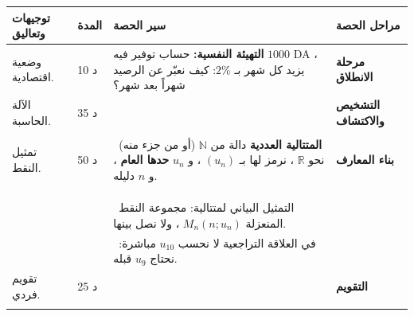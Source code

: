\documentclass[12pt,a4paper]{article}
\newenvironment{LTR}{\begin{otherlanguage}{english}}{\end{otherlanguage}}
\newcommand{\ar}[1]{\foreignlanguage{arabic}{#1}}
\newcommand{\Phase}[1]{\textbf{#1}}
\newenvironment{Sayr}{%
\begin{LTR}\renewcommand{\arraystretch}{1.25}\setlength{\tabcolsep}{4pt}\relpenalty=10000\binoppenalty=10000\tolerance=9000\emergencystretch=0.3\linewidth
\begin{longtable}{|p{0.09\textwidth}|>{\centering\arraybackslash}p{0.05\textwidth}|p{0.71\textwidth}|>{\centering\arraybackslash}p{0.09\textwidth}|}
\hline\rowcolor{cThm!12}\ar{\footnotesize\textbf{توجيهات وتعاليق}} & \ar{\footnotesize\textbf{المدة}} & \ar{\textbf{سير الحصة}} & \ar{\footnotesize\textbf{مراحل الحصة}}\\\hline\endhead
\hline\endfoot}{\end{longtable}\end{LTR}}
\newcommand{\Row}[4]{\ar{\small #4} & \ar{#3} & \ar{#2} & \cellcolor{cThm!8}\ar{\Phase{#1}}\\\hline}
\newcommand{\Lab}[2]{\foreignlanguage{english}{\tcbox[on line,colback=#1,colframe=#1,boxrule=0pt,arc=2pt,boxsep=1pt,left=5pt,right=5pt,top=1pt,bottom=1pt]{\ar{\textcolor{white}{\textbf{#2}}}}}}
\newcommand{\RR}[1]{\ifmmode{\color{cThm}#1}\else$\mbox{\color{cThm}#1}$\fi}
\newcommand{\T}[1]{$\mbox{\color{cDef}\bfseries #1}$}
\begin{document}
\begin{Sayr}
\Row{مرحلة الانطلاق}{%
\textbf{التهيئة النفسية:} حساب توفير فيه $1000$ DA ، يزيد كل شهر بـ $2\%$: كيف نعبّر عن الرصيد شهراً بعد شهر؟}{10 د}{وضعية اقتصادية.}
\Row{التشخيص والاكتشاف}{%
\Lab{cEx}{وضعية مقترحة}\ نرمز بـ $u_n$ للرصيد بعد $n$ شهراً ، مع $u_0=1000$.\par\textbf{(1)} احسب $u_1$ ، $u_2$ ، $u_3$.\par\textbf{(2)} عبّر عن $u_{n+1}$ بدلالة $u_n$.}{35 د}{الآلة الحاسبة.}
\Row{}{%
\Lab{cDef}{مناقشة النشاط}\par\textbf{(1)} \T{حساب الحدود:} زيادة $2\%$ تعني الضرب في $1+\dfrac2{100}=1{,}02$:\par $u_1=1000\times1{,}02=\RR{1020}$ ؛ $u_2=1020\times1{,}02=\RR{1040{,}4}$ ؛ $u_3=1040{,}4\times1{,}02=\RR{1061{,}208}$.\par\textbf{(2)} \T{العلاقة بين $u_{n+1}$ و $u_n$:} كل رصيد يُحسب من الرصيد الذي قبله: $\RR{u_{n+1}=1{,}02\,u_n}$ (علاقة تراجعية).}{}{}
\Row{بناء المعارف}{%
\Lab{cDef}{تعريف}\ \textbf{المتتالية العددية} دالة من $\mathbb N$ (أو من جزء منه) نحو $\mathbb R$ ، نرمز لها بـ $(u_n)$ ، و $u_n$ \textbf{حدها العام} ، و $n$ دليله.}{50 د}{تمثيل النقط.}
\Row{}{%
\Lab{cMeth}{طرق توليد متتالية}\par\textbf{(1)} \T{بدستور صريح} $u_n=f(n)$: نحسب أي حد مباشرة.\par\textbf{(2)} \T{بعلاقة تراجعية} $u_{n+1}=f(u_n)$ مع حد أول معلوم: نحسب الحدود واحداً بعد الآخر.}{}{}
\Row{}{%
\Lab{cEx}{مثال 1}\ (صريحة) $u_n=n^2-4n$:\par $u_0=0^2-4\times0=\RR{0}$ ؛ $u_1=1-4=\RR{-3}$ ؛ $u_2=4-8=\RR{-4}$ ؛ $u_3=9-12=\RR{-3}$.}{}{}
\Row{}{%
\Lab{cEx}{مثال 2}\ (تراجعية) $u_0=2$ و $u_{n+1}=2u_n-1$:\par $u_1=2u_0-1=2\times2-1=\RR{3}$ ؛ $u_2=2u_1-1=2\times3-1=\RR{5}$ ؛ $u_3=2u_2-1=2\times5-1=\RR{9}$.}{}{}
\Row{}{%
\Lab{cRem}{ملاحظات}\ التمثيل البياني لمتتالية: مجموعة النقط المنعزلة $M_n(n;u_n)$ ، ولا نصل بينها.}{}{}
\Row{}{%
\Lab{cThm!80!black}{حذار}\ في العلاقة التراجعية لا نحسب $u_{10}$ مباشرة: نحتاج $u_9$ قبله.}{}{}
\Row{التقويم}{%
\Lab{cMeth}{تمرين تطبيقي}\par $(v_n)$ معرّفة بـ: $v_n=\dfrac{n+1}{n+2}$ ، و $(w_n)$ معرّفة بـ: $w_0=2$ و $w_{n+1}=w_n^2-1$.\par\textbf{(1)} احسب $v_0$ ، $v_1$ ، $v_2$.\par\textbf{(2)} عبّر عن $v_{n+1}$ بدلالة $n$.\par\textbf{(3)} احسب $w_1$ و $w_2$.}{25 د}{تقويم فردي.}
\Row{}{%
\Lab{cEx}{حل التمرين التطبيقي}\par\textbf{(1)} $v_0=\dfrac{0+1}{0+2}=\RR{\dfrac12}$ ؛ $v_1=\dfrac{2}{3}$ ؛ $v_2=\RR{\dfrac34}$ ، و $v_1=\RR{\dfrac23}$.\par\textbf{(2)} نعوّض $n$ بـ $n+1$: $v_{n+1}=\dfrac{(n+1)+1}{(n+1)+2}=\RR{\dfrac{n+2}{n+3}}$.\par\textbf{(3)} $w_1=w_0^2-1=4-1=\RR{3}$ ؛ $w_2=w_1^2-1=9-1=\RR{8}$.\par\textbf{واجب منزلي:} تمارين من باب المتتاليات.\par\smallskip\textbf{ملاحظات حول سير الحصة:} \dotfill}{}{}
\end{Sayr}
\end{document}
